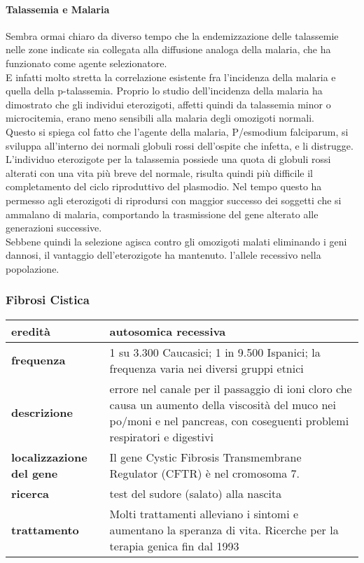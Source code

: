 \documentclass{article}
\begin{document}
\paragraph{Talassemia e Malaria}
Sembra ormai chiaro da diverso tempo che la endemizzazione delle
talassemie nelle zone indicate sia collegata alla diffusione analoga della
malaria, che ha funzionato come agente selezionatore.\\
E infatti molto stretta la correlazione esistente fra l'incidenza della
malaria e quella della p-talassemia. Proprio lo studio dell'incidenza della
malaria ha dimostrato che gli individui eterozigoti, affetti quindi da
talassemia minor o microcitemia, erano meno sensibili alla malaria degli
omozigoti normali.\\
Questo si spiega col fatto che l'agente della malaria, P/esmodium falciparum, si sviluppa all'interno dei normali globuli rossi dell'ospite che
infetta, e li distrugge. L'individuo eterozigote per la talassemia possiede
una quota di globuli rossi alterati con una vita più breve del normale,
risulta quindi più difficile il completamento del ciclo riproduttivo del
plasmodio. Nel tempo questo ha permesso agli eterozigoti di riprodursi
con maggior successo dei soggetti che si ammalano di malaria,
comportando la trasmissione del gene alterato alle generazioni successive.\\
Sebbene quindi la selezione agisca contro gli omozigoti malati eliminando
i geni dannosi, il vantaggio dell'eterozigote ha mantenuto. l'allele
recessivo nella popolazione.

\subsubsection{Fibrosi Cistica}
\begin{center}
    \begin{tabular}{lp{}}
        \toprule
        \textbf{eredità} & autosomica recessiva\\
        \midrule
        \textbf{frequenza} & 1 su 3.300 Caucasici; 1 in 9.500 Ispanici;
        la frequenza varia nei diversi gruppi etnici\\
        \midrule
        \textbf{descrizione} & errore nel canale per il passaggio di ioni
        cloro che causa un aumento della viscosità
        del muco nei po/moni e nel pancreas, con
        coseguenti problemi respiratori e digestivi\\
        \midrule
        \textbf{localizzazione del gene} &Il gene Cystic Fibrosis Transmembrane
        Regulator (CFTR) è nel cromosoma 7.\\
        \midrule
        \textbf{ricerca} & test del sudore (salato) alla nascita\\
        \textbf{trattamento} & Molti trattamenti alleviano i sintomi e aumentano la speranza di vita. Ricerche
        per la terapia genica fin dal 1993 \\
        \bottomrule
    \end{tabular}
\end{center}
\end{document}
